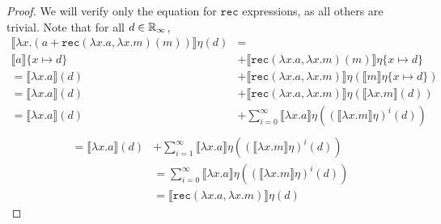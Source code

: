  \begin{proof}
 We will verify only the equation for $\texttt{rec}$ expressions, as all others are trivial.
 Note that for all $d \in \mathbb{R}_{\infty}$,
 \begin{align*}
 \llbracket \lambda x.(a + \texttt{rec}(\lambda x.a, \lambda x.m)(m)) \rrbracket \eta(d)
 &= \\  
  \llbracket a \rrbracket\{x\mapsto d\} &+ \llbracket \texttt{rec}(\lambda x.a, \lambda x.m)(m)\rrbracket\eta
 \{x\mapsto d\} \\
 = \llbracket \lambda x.a\rrbracket(d) &+ \llbracket\texttt{rec}(\lambda x.a, \lambda x.m)\rrbracket\eta
 (\llbracket m \rrbracket\eta\{x \mapsto d\}) \\
 =  \llbracket \lambda x.a\rrbracket(d) &+ \llbracket\texttt{rec}(\lambda x.a, \lambda x.m)\rrbracket\eta
 (\llbracket \lambda x.m \rrbracket(d)) \\
 = \llbracket \lambda x.a\rrbracket(d) &+ \sum_{i=0}^{\infty} \llbracket \lambda x.a\rrbracket\eta
 ((\llbracket \lambda x.m \rrbracket\eta)^i (d)) \\
 \end{align*}
 \begin{align*}
 = \llbracket \lambda x.a\rrbracket(d) &+ \sum_{i=1}^{\infty} \llbracket \lambda x.a\rrbracket\eta
 ((\llbracket \lambda x.m\rrbracket\eta)^i (d)) \\
&= \sum_{i=0}^\infty \llbracket \lambda x.a \rrbracket\eta ((\llbracket \lambda x.m\rrbracket\eta)^i(d)) \\
&=  \llbracket \texttt{rec}(\lambda x.a, \lambda x.m) \rrbracket \eta (d)
\end{align*}
\end{proof}

